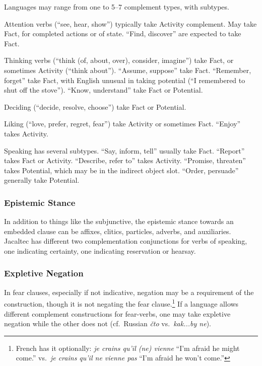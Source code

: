\documentclass[11pt]{article}
\newcommand{\E}[1]{\textit{#1}}   %
\begin{document}
Languages may range from one to 5--7 complement types, with subtypes.

Attention verbs (``see, hear, show'') typically take Activity
complement.  May take Fact, for completed actions or of state.
``Find, discover'' are expected to take Fact.

Thinking verbs (``think (of, about, over), consider, imagine'') take
Fact, or sometimes Activity (``think about'').  ``Assume, suppose''
take Fact.  ``Remember, forget'' take Fact, with English unusual in
taking potential (``I remembered to shut off the stove'').  ``Know,
understand'' take Fact or Potential.

Deciding (``decide, resolve, choose'') take Fact or Potential.

Liking (``love, prefer, regret, fear'') take Activity or sometimes
Fact.  ``Enjoy'' takes Activity.

Speaking has several subtypes.  ``Say, inform, tell'' usually take
Fact.  ``Report'' takes Fact or Activity.  ``Describe, refer to''
takes Activity.  ``Promise, threaten'' takes Potential, which may be
in the indirect object slot.  ``Order, persuade'' generally take
Potential. 

\subsubsection{Epistemic Stance}
In addition to things like the subjunctive, the epistemic stance
towards an embedded clause can be affixes, clitics, particles,
adverbs, and auxiliaries.  Jacaltec has different two complementation
conjunctions for verbs of speaking, one indicating certainty, one
indicating reservation or hearsay.

\subsubsection{Expletive Negation}
In fear clauses, especially if not indicative, negation may be a
requirement of the construction, though it is not negating the fear
clause.\footnote{French has it optionally: \E{je crains qu'il (ne)
    vienne} ``I'm afraid he might come.'' vs.\ \E{je crains qu'il ne
    vienne pas} ``I'm afraid he won't come.''}  If a language allows
different complement constructions for fear-verbs, one may take
expletive negation while the other does not (cf.\ Russian \E{čto}
vs.\ \E{kak...by ne}).
\end{document}
